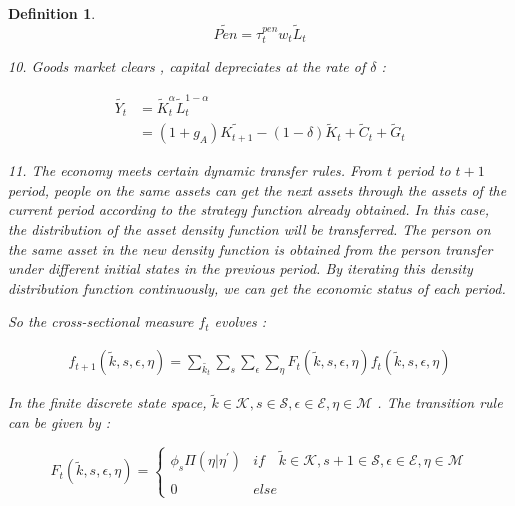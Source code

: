 \documentclass{article}
\newtheorem{definition}{Definition}[section]
\begin{document}
\begin{definition}
            \begin{equation}
                \tilde{Pen}=\tau_t^{pen}w_t\tilde{L}_t
            \end{equation}
        
        10. Goods market clears , capital depreciates at the rate of $\delta$ : 

            \begin{equation}
                \begin{aligned}
                   \tilde{Y_t}&=\tilde{K}_t^\alpha\tilde{L}_t^{1-\alpha} \\
                   &=(1+g_A)\tilde{K_{t+1}}-(1-\delta)\tilde{K}_t+\tilde{C}_t+\tilde{G}_t
                \end{aligned}
            \end{equation}
        
        11. The economy meets certain dynamic transfer rules. From $t$ period to $t + 1$ period, 
        people on the same assets can get the next assets through the assets of the current period according 
        to the strategy function already obtained. In this case, the distribution of the asset 
        density function will be transferred. The person on the same asset in the new density 
        function is obtained from the person transfer under different initial states in the previous period. 
        By iterating this density distribution function continuously, we can get the economic status of each period.

        So the cross-sectional measure $f_t$ evolves :

        \begin{equation}
            \begin{aligned}
                f_{t+1}(\tilde{k},s,\epsilon,\eta)=\sum_{\tilde{k_t}}\sum_{s}\sum_{\epsilon}\sum_{\eta}F_t(\tilde{k},s,\epsilon,\eta)
               f_{t}(\tilde{k},s,\epsilon,\eta)
            \end{aligned}   
        \end{equation}
        
        In the finite discrete state space, $\tilde{k}\in\mathcal{K},s\in\mathcal{S},\epsilon\in\mathcal{E},\eta\in\mathcal{M}$ .
        The transition rule can be given by :

        \begin{equation}
            F_t(\tilde{k},s,\epsilon,\eta)=
            \begin{cases}
                \phi_s\Pi(\eta|\eta^{'})& if \quad \tilde{k}\in\mathcal{K} , s+1\in\mathcal{S} , \epsilon\in\mathcal{E} , \eta\in\mathcal{M} \\
                \\
                0& else 
            \end{cases}      
        \end{equation}


\end{definition}
\end{document}
